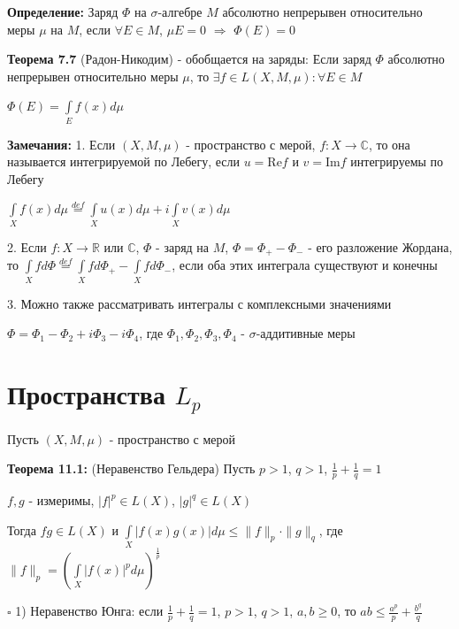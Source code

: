 \documentclass[a4paper]{report}
\begin{document}
\noindent\textbf{Определение:} Заряд $\Phi$ на $\sigma$-алгебре $M$ абсолютно непрерывен относительно меры $\mu$ на $M$, если $\forall E\in M$, $\mu E=0$ $\Rightarrow$ $\Phi(E)=0$
\bigskip

\noindent\textbf{Теорема 7.7} (Радон-Никодим) - обобщается на заряды: Если заряд $\Phi$ абсолютно непрерывен относительно меры $\mu$, то $\exists f\in L(X,M,\mu)\colon\forall E\in M$

$\Phi(E)=\displaystyle\int\limits_Ef(x)d\mu$
\bigskip

\noindent\textbf{Замечания:} 1. Если $(X,M,\mu)$ - пространство с мерой, $f\colon X\to\mathbb C$, то она называется интегрируемой по Лебегу, если $u=\mathrm{Re}f$ и $v=\mathrm{Im}f$ интегрируемы по Лебегу

$\displaystyle\int\limits_Xf(x)d\mu\stackrel{def}{=}\displaystyle\int\limits_X u(x)d\mu+i\displaystyle\int\limits_X v(x)d\mu$

2. Если $f\colon X\to\mathbb R$ или $\mathbb C$, $\Phi$ - заряд на $M$, $\Phi=\Phi_+-\Phi_-$ - его разложение Жордана, то $\displaystyle\int\limits_X fd\Phi
\stackrel{def}{=}\displaystyle\int\limits_X fd\Phi_+-\displaystyle\int\limits_Xfd\Phi_-$, если оба этих интеграла существуют и конечны

3. Можно также рассматривать интегралы с комплексными значениями

$\Phi=\Phi_1-\Phi_2+i\Phi_3-i\Phi_4$, где $\Phi_1,\Phi_2,\Phi_3,\Phi_4$ - $\sigma$-аддитивные меры






\chapter{Пространства $L_p$}

Пусть $(X,M,\mu)$ - пространство с мерой

\noindent\textbf{Теорема 11.1:} (Неравенство Гельдера) Пусть $p>1$, $q>1$, $\frac1p+\frac1q=1$

$f,g$ - измеримы, $|f|^p\in L(X)$, $|g|^q\in L(X)$

Тогда $fg\in L(X)$ и $\displaystyle\int\limits_X|f(x)g(x)|d\mu\le\|f\|_p\cdot\|g\|_q$, где $\|f\|_p=\left(\displaystyle\int\limits_X|f(x)|^pd\mu\right)^{\frac1p}$

\noindent $\square$ 1) Неравенство Юнга: если $\frac1p+\frac1q=1$, $p>1$, $q>1$, $a,b\ge0$, то $ab\le\frac{a^p}{p}+\frac{b^q}{q}$
\end{document}
